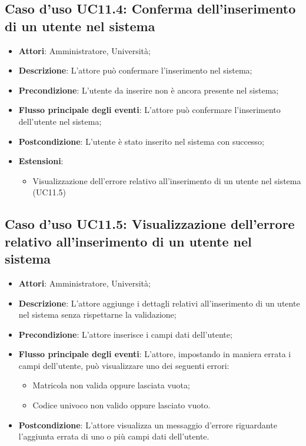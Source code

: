 \subsection{Caso d'uso \texorpdfstring{UC11.4}{UC11.4}: Conferma dell'inserimento di un utente nel sistema}
\begin{itemize}
\item \textbf{Attori}: Amministratore, Università;
\item \textbf{Descrizione}: L'attore può confermare l'inserimento nel sistema;
\item \textbf{Precondizione}: L'utente da inserire non è ancora presente nel sistema;
\item \textbf{Flusso principale degli eventi}: L'attore può confermare l'inserimento dell'utente nel sistema;
\item \textbf{Postcondizione}: L'utente è stato inserito nel sistema con successo;
\item \textbf{Estensioni}:
\begin{itemize}
\item Visualizzazione dell'errore relativo all'inserimento di un utente nel sistema (UC11.5)
\end{itemize}
\end{itemize}
\subsection{Caso d'uso \texorpdfstring{UC11.5}{UC11.5}: Visualizzazione dell'errore relativo all'inserimento di un utente nel sistema}
\begin{itemize}
\item \textbf{Attori}: Amministratore, Università;
\item \textbf{Descrizione}: L'attore aggiunge i dettagli relativi all'inserimento di un utente nel sistema senza rispettarne la validazione;
\item \textbf{Precondizione}: L'attore inserisce i campi dati dell'utente;
\item \textbf{Flusso principale degli eventi}: L'attore, impostando in maniera errata i campi dell'utente, può visualizzare uno dei seguenti errori:
\begin{itemize}
\item Matricola non valida oppure lasciata vuota;
\item Codice univoco non valido oppure lasciato vuoto.
\end{itemize}
\item \textbf{Postcondizione}: L'attore visualizza un messaggio d'errore riguardante l'aggiunta errata di uno o più campi dati dell'utente.
\end{itemize}
